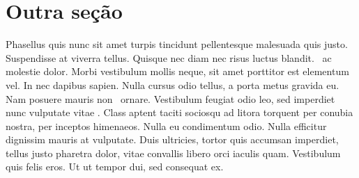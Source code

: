 \section{Outra seção}
Phasellus quis nunc sit amet turpis tincidunt pellentesque malesuada quis justo. Suspendisse at viverra tellus.
Quisque nec diam nec risus luctus blandit.\  ac molestie dolor. Morbi vestibulum mollis neque,
sit amet porttitor est elementum vel. In nec dapibus sapien. Nulla cursus odio tellus, a porta metus gravida eu.
Nam posuere mauris non\  ornare. Vestibulum feugiat odio leo, sed imperdiet nunc vulputate vitae
\cite{sinopse2019es}. Class aptent taciti sociosqu ad litora torquent per conubia nostra, per inceptos himenaeos.
Nulla eu condimentum odio. Nulla efficitur dignissim mauris at vulputate. Duis ultricies, tortor quis accumsan
imperdiet, tellus justo pharetra dolor, vitae convallis libero orci iaculis quam. Vestibulum quis felis eros.
Ut ut tempor dui, sed consequat ex.
